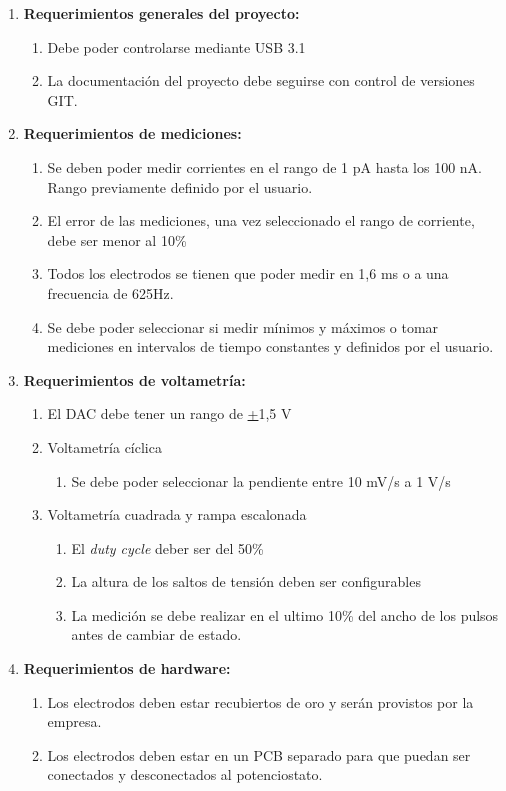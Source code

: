 \documentclass[11pt]{charter}
\begin{document}
\begin{enumerate}

\item \textbf{Requerimientos generales del proyecto:}
\begin{enumerate}
	\item Debe poder controlarse mediante USB 3.1
	\item La documentación del proyecto debe seguirse con control de versiones GIT.
\end{enumerate}

\item \textbf{Requerimientos de mediciones:}
\begin{enumerate}
	\item Se deben poder medir corrientes en el rango de 1 pA hasta los 100 nA. Rango previamente definido por el usuario.
	\item El error de las mediciones, una vez seleccionado el rango de corriente, debe ser menor al 10\%
	\item Todos los electrodos se tienen que poder medir en 1,6 ms o a una frecuencia de 625Hz.
	\item Se debe poder seleccionar si medir mínimos y máximos o tomar mediciones en intervalos de tiempo constantes y definidos por el usuario.
\end{enumerate}

\item \textbf{Requerimientos de voltametría:}
\begin{enumerate}
	\item El DAC debe tener un rango de \underline{+}1,5 V
	\item Voltametría cíclica
	\begin{enumerate}
		\item Se debe poder seleccionar la pendiente entre 10 mV/s a 1 V/s 
	\end{enumerate}
	\item Voltametría cuadrada y rampa escalonada
	\begin{enumerate}
		\item El \textit{duty cycle} deber ser del 50\%
		\item La altura de los saltos de tensión deben ser configurables
		\item La medición se debe realizar en el ultimo 10\% del ancho de los pulsos antes de cambiar de estado.
	\end{enumerate}
\end{enumerate}

\item \textbf{Requerimientos de hardware:}
\begin{enumerate}
	\item Los electrodos deben estar recubiertos de oro y serán provistos por la empresa.
	\item Los electrodos deben estar en un PCB separado para que puedan ser conectados y desconectados al potenciostato.
\end{enumerate}

\end{enumerate}
\end{document}
